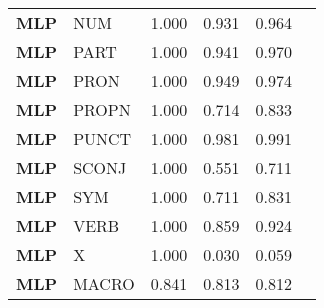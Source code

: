 \begin{table}
\begin{tabular}{|l|l|l|l|l|l|}
\textbf{MLP} & NUM & 1.000 & 0.931 & 0.964 \\
\textbf{MLP} & PART & 1.000 & 0.941 & 0.970 \\
\textbf{MLP} & PRON & 1.000 & 0.949 & 0.974 \\
\textbf{MLP} & PROPN & 1.000 & 0.714 & 0.833 \\
\textbf{MLP} & PUNCT & 1.000 & 0.981 & 0.991 \\
\textbf{MLP} & SCONJ & 1.000 & 0.551 & 0.711 \\
\textbf{MLP} & SYM & 1.000 & 0.711 & 0.831 \\
\textbf{MLP} & VERB & 1.000 & 0.859 & 0.924 \\
\textbf{MLP} & X & 1.000 & 0.030 & 0.059 \\
\textbf{MLP} & MACRO & 0.841 & 0.813 & 0.812 \\
\bottomrule
\end{tabular}
\end{table}

